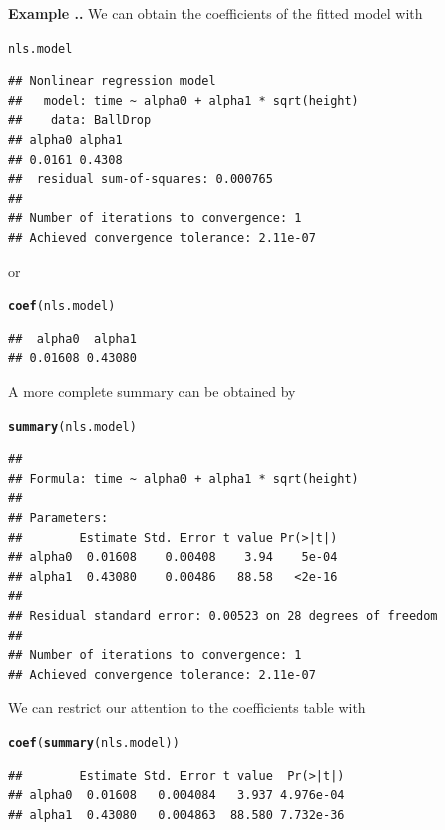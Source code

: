 \documentclass[twoside]{book}\usepackage[]{graphicx}\usepackage[]{xcolor}
\makeatletter
\newcommand{\hlstd}[1]{\textcolor[rgb]{0.345,0.345,0.345}{#1}}%
\newcommand{\hlkwd}[1]{\textcolor[rgb]{0.737,0.353,0.396}{\textbf{#1}}}%
\newenvironment{kframe}{%
 \def\at@end@of@kframe{}%
 \ifinner\ifhmode%
  \def\at@end@of@kframe{\end{minipage}}%
  \begin{minipage}{\columnwidth}%
 \fi\fi%
 \def\FrameCommand##1{\hskip\@totalleftmargin \hskip-\fboxsep
 \colorbox{shadecolor}{##1}\hskip-\fboxsep
     \hskip-\linewidth \hskip-\@totalleftmargin \hskip\columnwidth}%
 \MakeFramed {\advance\hsize-\width
   \@totalleftmargin\z@ \linewidth\hsize
   \@setminipage}}%
 {\par\unskip\endMakeFramed%
 \at@end@of@kframe}
\newenvironment{knitrout}{}{} %
\newcounter{example}[section]
\newenvironment{example}%
{\refstepcounter{example}%
\textbf{Example \thesection.\arabic{example}. }}%
{}
\makeatother
\begin{document}
\begin{example}
	We can obtain the coefficients of the fitted model with
\begin{knitrout}
\color{fgcolor}\begin{kframe}
\begin{alltt}
\hlstd{nls.model}
\end{alltt}
\begin{verbatim}
## Nonlinear regression model
##   model: time ~ alpha0 + alpha1 * sqrt(height)
##    data: BallDrop
## alpha0 alpha1 
## 0.0161 0.4308 
##  residual sum-of-squares: 0.000765
## 
## Number of iterations to convergence: 1 
## Achieved convergence tolerance: 2.11e-07
\end{verbatim}
\end{kframe}
\end{knitrout}
or
\begin{knitrout}
\color{fgcolor}\begin{kframe}
\begin{alltt}
\hlkwd{coef}\hlstd{(nls.model)}
\end{alltt}
\begin{verbatim}
##  alpha0  alpha1 
## 0.01608 0.43080
\end{verbatim}
\end{kframe}
\end{knitrout}
A more complete summary can be obtained by
\begin{knitrout}
\color{fgcolor}\begin{kframe}
\begin{alltt}
\hlkwd{summary}\hlstd{(nls.model)}
\end{alltt}
\begin{verbatim}
## 
## Formula: time ~ alpha0 + alpha1 * sqrt(height)
## 
## Parameters:
##        Estimate Std. Error t value Pr(>|t|)
## alpha0  0.01608    0.00408    3.94    5e-04
## alpha1  0.43080    0.00486   88.58   <2e-16
## 
## Residual standard error: 0.00523 on 28 degrees of freedom
## 
## Number of iterations to convergence: 1 
## Achieved convergence tolerance: 2.11e-07
\end{verbatim}
\end{kframe}
\end{knitrout}
We can restrict our attention to the coefficients table with
\begin{knitrout}
\color{fgcolor}\begin{kframe}
\begin{alltt}
\hlkwd{coef}\hlstd{(}\hlkwd{summary}\hlstd{(nls.model))}
\end{alltt}
\begin{verbatim}
##        Estimate Std. Error t value  Pr(>|t|)
## alpha0  0.01608   0.004084   3.937 4.976e-04
## alpha1  0.43080   0.004863  88.580 7.732e-36
\end{verbatim}
\end{kframe}
\end{knitrout}


\end{example}
\end{document}
